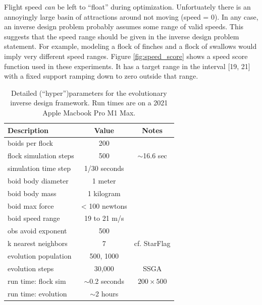 \documentclass[letterpaper]{article}
\begin{document}
Flight speed \textit{can} be left to “float” during optimization. Unfortuately there is an annoyingly large basin of attractions around not moving (speed = 0). In any case, an inverse design problem probably assumes some range of valid speeds. This suggests that the speed range should be given in the inverse design problem statement. For example, modeling a flock of finches and a flock of swallows would imply very different speed ranges. Figure \ref{fig:speed_score} shows a speed score function used in these experiments. It has a target range in the interval [19, 21] with a fixed support ramping down to zero outside that range.



\begin{table}[b]
\centering
\begin{tabular}{ | l | c | c | }
    \hline
    \textbf{Description} & \textbf{Value} & \textbf{Notes} \\
    \hline
    boids per flock & 200 &  \\
    flock simulation steps & 500 & $\sim$16.6 sec \\
    simulation time step & 1/30 seconds & \\
    \hline
    boid body diameter & 1 meter & \\
    boid body mass & 1 kilogram & \\
    boid max force & < 100 newtons & \\
    boid speed range & 19 to 21 m/s & \\
    obs avoid exponent & 500 & \\
    k nearest neighbors & 7 & cf. StarFlag \\
    \hline
    evolution population & 500, 1000 & \\
    evolution steps & 30,000 & SSGA \\
    \hline
    run time: flock sim & $\sim$0.2 seconds & $200{\times}500$ \\
    run time: evolution & $\sim$2 hours & \\
    \hline
\end{tabular}
\caption{Detailed (``hyper'')parameters for the evolutionary inverse design framework. Run times are on a 2021 Apple Macbook Pro M1 Max.}
\label{table:HyperParameters}
\end{table}
\end{document}
